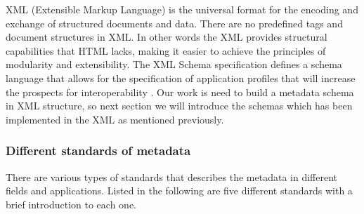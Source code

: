 XML (Extensible Markup Language) is the universal format for the encoding and exchange of structured documents and data. There are no predefined tags and document structures in XML. In other words the XML provides structural capabilities that HTML lacks, making it easier to achieve the principles of modularity and extensibility. The XML Schema specification defines a schema language that allows for the specification of application profiles that will increase the prospects for interoperability \cite{duval2002metadata}. Our work is need to build a metadata schema in XML structure, so next section we will introduce the schemas which has been implemented in the XML as mentioned previously.


\subsubsection*{Different standards of metadata}
\label{sec:mets}
There are various types of standards that describes the metadata in different fields and applications. Listed in the following are five different standards with a brief introduction to each one.

